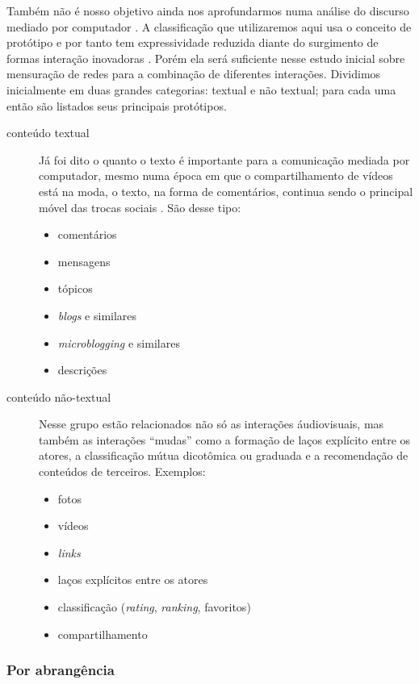 \documentclass{article}
\begin{document}
Também não é nosso objetivo ainda nos aprofundarmos numa análise do discurso
mediado por computador \cite{Herring2001}. A classificação que utilizaremos 
aqui usa o conceito de protótipo e por tanto tem expressividade reduzida diante
do surgimento de formas interação inovadoras \cite{Herring2007}. Porém ela será
suficiente nesse estudo inicial sobre mensuração de redes para a combinação de
diferentes interações. Dividimos inicialmente em duas grandes categorias:
textual e não textual; para cada uma então são listados seus principais
protótipos.

\begin{description}
\item[conteúdo textual] Já foi dito o quanto o texto é importante para a
comunicação mediada por computador, mesmo numa época em que o compartilhamento
de vídeos está na moda, o texto, na forma de comentários, continua sendo o
principal móvel das trocas sociais \cite{Herring2002}. São desse tipo:
\begin{itemize}
  \item comentários
  \item mensagens
  \item tópicos
  \item \textit{blogs} e similares
  \item \textit{microblogging} e similares
  \item descrições
\end{itemize}
\item[conteúdo não-textual] Nesse grupo estão relacionados não só as interações
áudiovisuais, mas também as interações ``mudas'' como a formação de laços
explícito entre os atores, a classificação mútua dicotômica ou graduada e a
recomendação de conteúdos de terceiros. Exemplos:
\begin{itemize}
  \item fotos
  \item vídeos
  \item \textit{links}
  \item laços explícitos entre os atores
  \item classificação (\textit{rating}, \textit{ranking}, favoritos)
  \item compartilhamento
\end{itemize}
\end{description}

\subsubsection{Por abrangência}
\end{document}
